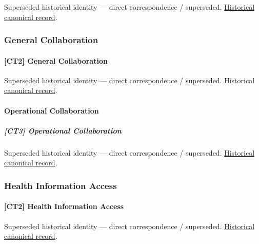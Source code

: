 \par\label{element:15d972931ed6447797c30a5ddb71737e}
Superseded historical identity — direct correspondence / superseded. \href{../../../../continuum/strategy/capability/15d972931ed6447797c30a5ddb71737e.md}{Historical canonical record}.\par

\subsubsection{General Collaboration}

\paragraph{[CT2] General Collaboration}

\par\label{element:4f58c82aca7a4b54aeb6e2920ce5c12a}
Superseded historical identity — direct correspondence / superseded. \href{../../../../continuum/strategy/capability/4f58c82aca7a4b54aeb6e2920ce5c12a.md}{Historical canonical record}.\par

\paragraph{Operational Collaboration}

\subparagraph{[CT3] Operational Collaboration}

\par\label{element:99e9d9763ec94140b7d7642f4b5966f6}
Superseded historical identity — direct correspondence / superseded. \href{../../../../continuum/strategy/capability/99e9d9763ec94140b7d7642f4b5966f6.md}{Historical canonical record}.\par

\subsubsection{Health Information Access}

\paragraph{[CT2] Health Information Access}

\par\label{element:5019ae9f2cdc45a1b2de97bc0f5a313d}
Superseded historical identity — direct correspondence / superseded. \href{../../../../continuum/strategy/capability/5019ae9f2cdc45a1b2de97bc0f5a313d.md}{Historical canonical record}.\par

